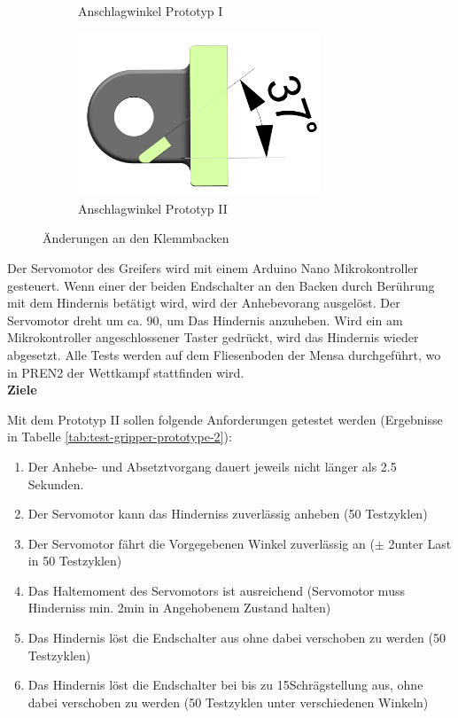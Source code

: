 \begin{figure}[H]
\begin{subfigure}{0.49\textwidth}
\caption{Anschlagwinkel Prototyp I}
\label{fig:jaw_old_section}
\end{subfigure}
\begin{subfigure}{0.49\textwidth}
\centering
\includegraphics[width=0.8\textwidth]{assets/greifer-prototyp/Backe_neu_schnitt.png}
\caption{Anschlagwinkel Prototyp II}
\label{fig:jaw_new_section}
\end{subfigure}
\caption{Änderungen an den Klemmbacken}
\label{fig:jaw_iteration}
\end{figure}

Der Servomotor des Greifers wird mit einem Arduino Nano Mikrokontroller gesteuert. Wenn einer der beiden Endschalter an den Backen durch Berührung mit dem Hindernis betätigt wird, wird der Anhebevorang ausgelöst. Der Servomotor dreht um ca. 90\textdegree,  
um Das Hindernis anzuheben. Wird ein am Mikrokontroller angeschlossener Taster gedrückt, wird das Hindernis wieder abgesetzt. Alle Tests werden auf dem Fliesenboden der Mensa durchgeführt, wo in PREN2 der Wettkampf stattfinden wird.\\

\textbf{Ziele}

Mit dem Prototyp II sollen folgende Anforderungen getestet werden (Ergebnisse in Tabelle \ref{tab:test-gripper-prototype-2}):

\begin{enumerate}
    \item Der Anhebe- und Absetztvorgang dauert jeweils nicht länger als 2.5 Sekunden.
    \item Der Servomotor kann das Hinderniss zuverlässig anheben (50 Testzyklen)
    \item Der Servomotor fährt die Vorgegebenen Winkel zuverlässig an ($\pm$ 2\textdegree unter Last in 50 Testzyklen)
    \item Das Haltemoment des Servomotors ist ausreichend (Servomotor muss Hinderniss min. 2min in Angehobenem Zustand halten)
    \item Das Hindernis löst die Endschalter aus ohne dabei verschoben zu werden (50 Testzyklen)
    \item Das Hindernis löst die Endschalter bei bis zu 15\textdegree  Schrägstellung aus, ohne dabei verschoben zu werden (50 Testzyklen unter verschiedenen Winkeln)
\end{enumerate}

